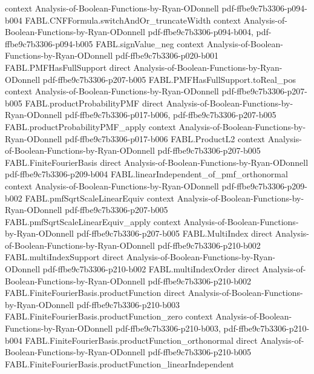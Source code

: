 \begin{theorem}
  {context}
  {Analysis-of-Boolean-Functions-by-Ryan-ODonnell}
  {pdf-ffbe9c7b3306-p094-b004}
\proofstep
  {FABL.CNFFormula.switchAndOr_truncateWidth}
  {context}
  {Analysis-of-Boolean-Functions-by-Ryan-ODonnell}
  {pdf-ffbe9c7b3306-p094-b004,
    pdf-ffbe9c7b3306-p094-b005}
\proofstep
  {FABL.signValue_neg}
  {context}
  {Analysis-of-Boolean-Functions-by-Ryan-ODonnell}
  {pdf-ffbe9c7b3306-p020-b001}
\proofstep
  {FABL.PMFHasFullSupport}
  {direct}
  {Analysis-of-Boolean-Functions-by-Ryan-ODonnell}
  {pdf-ffbe9c7b3306-p207-b005}
\proofstep
  {FABL.PMFHasFullSupport.toReal_pos}
  {context}
  {Analysis-of-Boolean-Functions-by-Ryan-ODonnell}
  {pdf-ffbe9c7b3306-p207-b005}
\proofstep
  {FABL.productProbabilityPMF}
  {direct}
  {Analysis-of-Boolean-Functions-by-Ryan-ODonnell}
  {pdf-ffbe9c7b3306-p017-b006,
    pdf-ffbe9c7b3306-p207-b005}
\proofstep
  {FABL.productProbabilityPMF_apply}
  {context}
  {Analysis-of-Boolean-Functions-by-Ryan-ODonnell}
  {pdf-ffbe9c7b3306-p017-b006}
\proofstep
  {FABL.ProductL2}
  {context}
  {Analysis-of-Boolean-Functions-by-Ryan-ODonnell}
  {pdf-ffbe9c7b3306-p207-b005}
\proofstep
  {FABL.FiniteFourierBasis}
  {direct}
  {Analysis-of-Boolean-Functions-by-Ryan-ODonnell}
  {pdf-ffbe9c7b3306-p209-b004}
\proofstep
  {FABL.linearIndependent_of_pmf_orthonormal}
  {context}
  {Analysis-of-Boolean-Functions-by-Ryan-ODonnell}
  {pdf-ffbe9c7b3306-p209-b002}
\proofstep
  {FABL.pmfSqrtScaleLinearEquiv}
  {context}
  {Analysis-of-Boolean-Functions-by-Ryan-ODonnell}
  {pdf-ffbe9c7b3306-p207-b005}
\proofstep
  {FABL.pmfSqrtScaleLinearEquiv_apply}
  {context}
  {Analysis-of-Boolean-Functions-by-Ryan-ODonnell}
  {pdf-ffbe9c7b3306-p207-b005}
\proofstep
  {FABL.MultiIndex}
  {direct}
  {Analysis-of-Boolean-Functions-by-Ryan-ODonnell}
  {pdf-ffbe9c7b3306-p210-b002}
\proofstep
  {FABL.multiIndexSupport}
  {direct}
  {Analysis-of-Boolean-Functions-by-Ryan-ODonnell}
  {pdf-ffbe9c7b3306-p210-b002}
\proofstep
  {FABL.multiIndexOrder}
  {direct}
  {Analysis-of-Boolean-Functions-by-Ryan-ODonnell}
  {pdf-ffbe9c7b3306-p210-b002}
\proofstep
  {FABL.FiniteFourierBasis.productFunction}
  {direct}
  {Analysis-of-Boolean-Functions-by-Ryan-ODonnell}
  {pdf-ffbe9c7b3306-p210-b003}
\proofstep
  {FABL.FiniteFourierBasis.productFunction_zero}
  {context}
  {Analysis-of-Boolean-Functions-by-Ryan-ODonnell}
  {pdf-ffbe9c7b3306-p210-b003,
    pdf-ffbe9c7b3306-p210-b004}
\proofstep
  {FABL.FiniteFourierBasis.productFunction_orthonormal}
  {direct}
  {Analysis-of-Boolean-Functions-by-Ryan-ODonnell}
  {pdf-ffbe9c7b3306-p210-b005}
\proofstep
  {FABL.FiniteFourierBasis.productFunction_linearIndependent}

\end{theorem}
